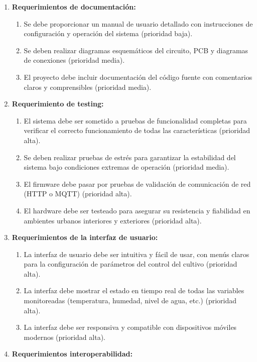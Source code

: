 \documentclass[
11pt, %
]{charter}
\begin{document}
\begin{enumerate}
	\item \textbf{Requerimientos de documentación:}
		\begin{enumerate}
			\item Se debe proporcionar un manual de usuario detallado con instrucciones de configuración y operación del sistema (prioridad baja).
			\item Se deben realizar diagramas esquemáticos del circuito, PCB y diagramas de conexiones (prioridad media).
			\item El proyecto debe incluir documentación del código fuente con comentarios claros y comprensibles (prioridad media).
		\end{enumerate}
	\item \textbf{Requerimiento de testing:}
	\begin{enumerate}
	\item El sistema debe ser sometido a pruebas de funcionalidad completas para verificar el correcto funcionamiento de todas las características (prioridad alta).
	\item Se deben realizar pruebas de estrés para garantizar la estabilidad del sistema bajo condiciones extremas de operación (prioridad media).
	\item El firmware debe pasar por pruebas de validación de comunicación de red (HTTP o MQTT) (prioridad alta).
	\item El hardware debe ser testeado para asegurar su resistencia y fiabilidad en ambientes urbanos interiores y exteriores (prioridad alta).
	\end{enumerate}
	\item \textbf{Requerimientos de la interfaz de usuario:}
	\begin{enumerate}
	\item La interfaz de usuario debe ser intuitiva y fácil de usar, con menús claros para la configuración de parámetros del control del cultivo (prioridad alta).
	\item La interfaz debe mostrar el estado en tiempo real de todas las variables monitoreadas (temperatura, humedad, nivel de agua, etc.) (prioridad alta).
	\item La interfaz debe ser responsiva y compatible con dispositivos móviles modernos (prioridad alta).
	\end{enumerate}
	\item \textbf{Requerimientos interoperabilidad:}

\end{enumerate}
\end{document}
